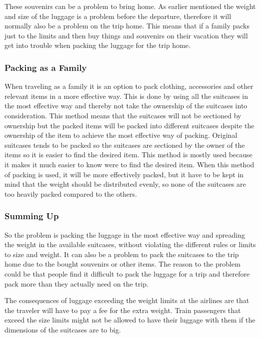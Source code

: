 These souvenirs can be a problem to bring home. As earlier mentioned the weight and size of the luggage is a problem before the departure, therefore it will normally also be a problem on the trip home.
This means that if a family packs just to the limits and then buy things and souvenirs on their vacation they will get into trouble when packing the luggage for the trip home.

\subsubsection{Packing as a Family}
When traveling as a family it is an option to pack clothing, accessories and other relevant items in a more effective way. This is done by using all the suitcases in the most effective way and thereby not take the ownership of the suitcases into consideration. This method means that the suitcases will not be sectioned by ownership but the packed items will be packed into different suitcases despite the ownership of the item to achieve the most effective way of packing. Original suitcases tends to be packed so the suitcases are sectioned by the owner of the items so it is easier to find the desired item. This method is mostly used because it makes it much easier to know were to find the desired item. When this method of packing is used, it will be more effectively packed, but it have to be kept in mind that the weight should be distributed evenly, so none of the suitcases are too heavily packed compared to the others.

\subsubsection{Summing Up}
So the problem is packing the luggage in the most effective way and spreading the weight in the available suitcases, without violating the different rules or limits to size and weight. It can also be a problem to pack the suitcases to the trip home due to the bought souvenirs or other items. The reason to the problem could be that people find it difficult to pack the luggage for a trip and therefore pack more than they actually need on the trip.

The consequences of luggage exceeding the weight limits at the airlines are that the traveler will have to pay a fee for the extra weight.
Train passengers that exceed the size limits might not be allowed to have their luggage with them if the dimensions of the suitcases are to big.
